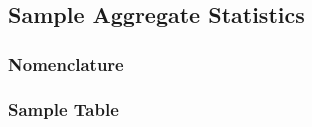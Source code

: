 

\doublespacing
\section*{}
\thispagestyle{empty}       %
\begin{center}
\begin{Large}
\vspace{50mm}
\subsection{Sample Aggregate Statistics}
\vspace{6mm}
\subsubsection{Nomenclature}
\subsubsection{Sample Table}
\end{Large}
\end{center}
